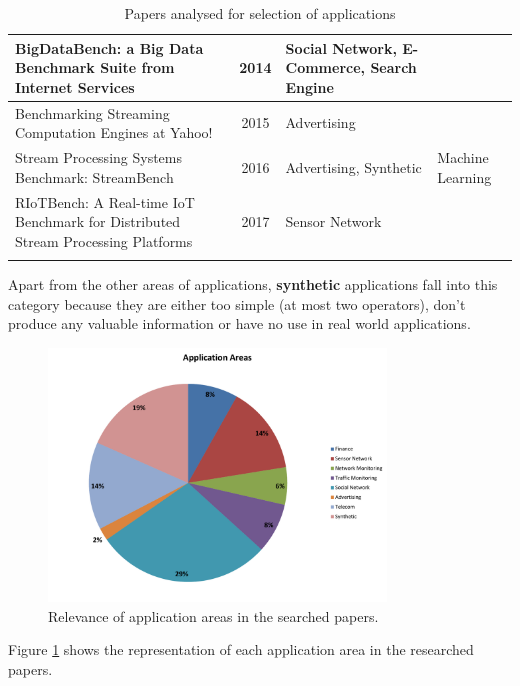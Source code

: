 \documentclass[ppgc,diss,english]{iiufrgs}
\begin{document}
\begin{center}
\begin{longtable}{ | p{8cm} | c | p{3cm} | p{2.5cm} |}
		BigDataBench: a Big Data Benchmark Suite from Internet Services \cite{wang2014bigdatabench} & 2014 & Social Network, E-Commerce, Search Engine & \\\hline
		
		Benchmarking Streaming Computation Engines at Yahoo! \cite{yahoo2015bench} & 2015 & Advertising & \\\hline
		
		Stream Processing Systems Benchmark: StreamBench \cite{wang2016stream} & 2016 & Advertising, Synthetic & Machine Learning \\\hline
		
		RIoTBench: A Real-time IoT Benchmark for Distributed Stream Processing Platforms \cite{shukla2017riotbench} & 2017 & Sensor Network & \\\hline
		
	
	\caption{Papers analysed for selection of applications}
	\label{table:papers_analysis}
	\end{longtable}
\end{center}

Apart from the other areas of applications, \textbf{synthetic} applications fall into this category because they are either too simple (at most two operators), don't produce any valuable information or have no use in real world applications.

\begin{figure}[H]
	\centering
	\includegraphics[width=0.8\textwidth]{images/ApplicationSelection.pdf}
	\caption{Relevance of application areas in the searched papers.}
	\label{fig:app_selection_areas}
\end{figure}

Figure \ref{fig:app_selection_areas} shows the representation of each application area in the researched papers.
\end{document}
